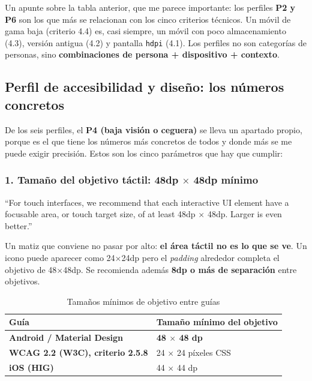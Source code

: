 \documentclass[11pt,a4paper]{article}
\newcommand{\code}[1]{\texttt{\color{navylight}#1}}
\begin{document}
	Un apunte sobre la tabla anterior, que me parece importante: los perfiles \textbf{P2 y P6} son los que más se relacionan con los cinco criterios técnicos. Un móvil de gama baja (criterio 4.4) es, casi siempre, un móvil con poco almacenamiento (4.3), versión antigua (4.2) y pantalla \code{hdpi} (4.1). Los perfiles no son categorías de personas, sino \textbf{combinaciones de persona + dispositivo + contexto}.
	
	\subsection{Perfil de accesibilidad y diseño: los números concretos}
	
	De los seis perfiles, el \textbf{P4 (baja visión o ceguera)} se lleva un apartado propio, porque es el que tiene los números más concretos de todos y donde más se me puede exigir precisión. Estos son los cinco parámetros que hay que cumplir:
	
	\subsubsection*{1. Tamaño del objetivo táctil: 48dp $\times$ 48dp mínimo}
	
	\enquote{For touch interfaces, we recommend that each interactive UI element have a focusable area, or touch target size, of at least 48dp $\times$ 48dp. Larger is even better.}
	
	Un matiz que conviene no pasar por alto: \textbf{el área táctil no es lo que se ve}. Un icono puede aparecer como 24$\times$24dp pero el \emph{padding} alrededor completa el objetivo de 48$\times$48dp. Se recomienda además \textbf{8dp o más de separación} entre objetivos.
	
	\begin{table}[htbp]
		\centering
		\small
		\begin{tabular}{@{}l l@{}}
			\toprule
			\rowcolor{primary}
			\textcolor{paper}{\sffamily\bfseries Guía} & \textcolor{paper}{\sffamily\bfseries Tamaño mínimo del objetivo} \\
			\midrule
			\textbf{Android / Material Design} & \textbf{48 $\times$ 48 dp} \\
			\rowcolor{soft}
			\textbf{WCAG 2.2 (W3C), criterio 2.5.8} & 24 $\times$ 24 píxeles CSS \\
			\textbf{iOS (HIG)} & 44 $\times$ 44 dp \\
			\bottomrule
		\end{tabular}
		\caption{Tamaños mínimos de objetivo entre guías}
	\end{table}
	
\end{document}
